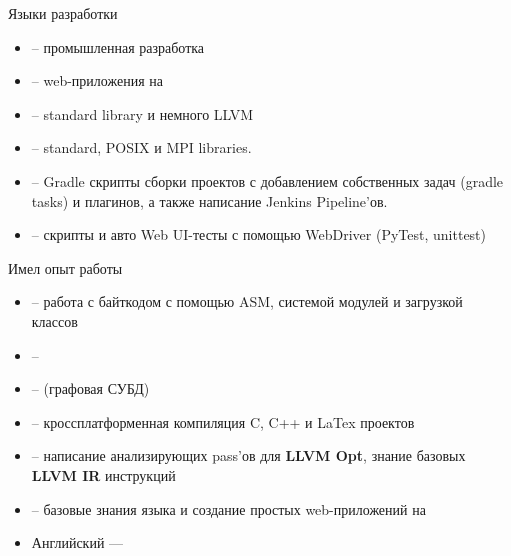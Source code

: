 \documentclass[10pt,a4paper,ragged2e,withhyper]{custom-altacv}
\begin{document}
\begin{paracol}{2}

\textcolor{emphasis}{Языки разработки}
\vspace{2ex}

\begin{itemize}
	\item {} -- промышленная разработка
	\item {} -- web-приложения на 
	\item {} -- standard library и немного LLVM
	\item {} -- standard, POSIX и MPI libraries.
	\item {} -- Gradle скрипты сборки проектов с добавлением собственных задач (gradle tasks) и плагинов, а также написание Jenkins Pipeline'ов.
	\vspace{1ex}
	\item {} -- скрипты и авто Web UI-тесты с помощью WebDriver (PyTest, unittest)
\end{itemize}

\divider

\textcolor{emphasis}{Имел опыт работы}
\vspace{2ex}

\begin{itemize}
	\item {} -- работа с байткодом с помощью ASM, системой модулей и загрузкой классов
	\item {} -- 
	\item {} --  (графовая СУБД)
	\item {} -- кроссплатформенная компиляция C, C++ и LaTex проектов
	\item {} -- написание анализирующих pass'ов для \textbf{LLVM Opt}, знание базовых \textbf{LLVM IR} инструкций
	\item {} -- базовые знания языка и создание простых web-приложений на 
\end{itemize}




\begin{itemize}
	\item Английский --- 
\end{itemize}

\end{paracol}
\end{document}
